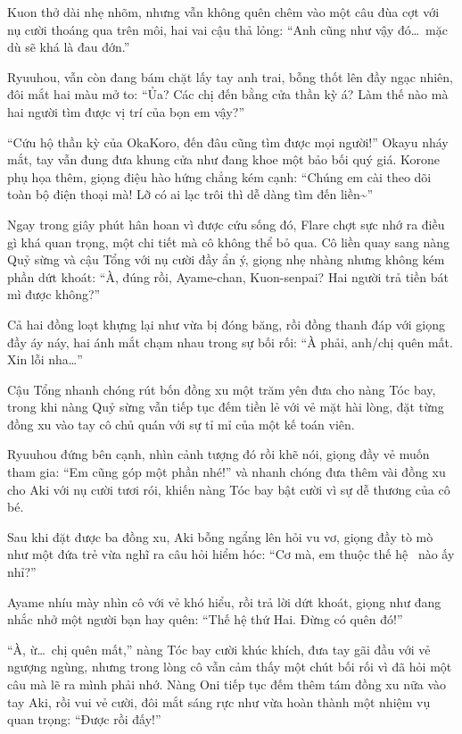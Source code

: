 \documentclass[../main.tex]{subfiles}
\begin{document}
Kuon thở dài nhẹ nhõm, nhưng vẫn không quên chêm vào một câu đùa cợt với nụ cười thoáng qua trên môi, hai vai cậu thả lỏng: ``Anh cũng như vậy đó\dots\ mặc dù sẽ khá là đau đớn.''

Ryuuhou, vẫn còn đang bám chặt lấy tay anh trai, bỗng thốt lên đầy ngạc nhiên, đôi mắt hai màu mở to: ``Ủa? Các chị đến bằng cửa thần kỳ á? Làm thế nào mà hai người tìm được vị trí của bọn em vậy?''

``Cứu hộ thần kỳ của OkaKoro, đến đâu cũng tìm được mọi người!'' Okayu nháy mắt, tay vẫn đung đưa khung cửa như đang khoe một bảo bối quý giá. Korone phụ họa thêm, giọng điệu hào hứng chẳng kém cạnh: ``Chúng em cài theo dõi toàn bộ điện thoại mà! Lỡ có ai lạc trôi thì dễ dàng tìm đến liền\~{}''

Ngay trong giây phút hân hoan vì được cứu sống đó, Flare chợt sực nhớ ra điều gì khá quan trọng, một chi tiết mà cô không thể bỏ qua. Cô liền quay sang nàng Quỷ sừng và cậu Tổng với nụ cười đầy ẩn ý, giọng nhẹ nhàng nhưng không kém phần dứt khoát: ``À, đúng rồi, Ayame-chan, Kuon-senpai? Hai người trả tiền bát mì được không?''

Cả hai đồng loạt khựng lại như vừa bị đóng băng, rồi đồng thanh đáp với giọng đầy áy náy, hai ánh mắt chạm nhau trong sự bối rối: ``À phải, anh/chị quên mất. Xin lỗi nha\dots''

Cậu Tổng nhanh chóng rút bốn đồng xu một trăm yên đưa cho nàng Tóc bay, trong khi nàng Quỷ sừng vẫn tiếp tục đếm tiền lẻ với vẻ mặt hài lòng, đặt từng đồng xu vào tay cô chủ quán với sự tỉ mỉ của một kế toán viên.

Ryuuhou đứng bên cạnh, nhìn cảnh tượng đó rồi khẽ nói, giọng đầy vẻ muốn tham gia: ``Em cũng góp một phần nhé!'' và nhanh chóng đưa thêm vài đồng xu cho Aki với nụ cười tươi rói, khiến nàng Tóc bay bật cười vì sự dễ thương của cô bé.

Sau khi đặt được ba đồng xu, Aki bỗng ngẩng lên hỏi vu vơ, giọng đầy tò mò như một đứa trẻ vừa nghĩ ra câu hỏi hiểm hóc: ``Cơ mà, em thuộc thế hệ \hll\ nào ấy nhỉ?''

Ayame nhíu mày nhìn cô với vẻ khó hiểu, rồi trả lời dứt khoát, giọng như đang nhắc nhở một người bạn hay quên: ``Thế hệ thứ Hai. Đừng có quên đó!''

``À, ừ\dots\ chị quên mất,'' nàng Tóc bay cười khúc khích, đưa tay gãi đầu với vẻ ngượng ngùng, nhưng trong lòng cô vẫn cảm thấy một chút bối rối vì đã hỏi một câu mà lẽ ra mình phải nhớ. Nàng Oni tiếp tục đếm thêm tám đồng xu nữa vào tay Aki, rồi vui vẻ cười, đôi mắt sáng rực như vừa hoàn thành một nhiệm vụ quan trọng: ``Được rồi đấy!''
\end{document}
